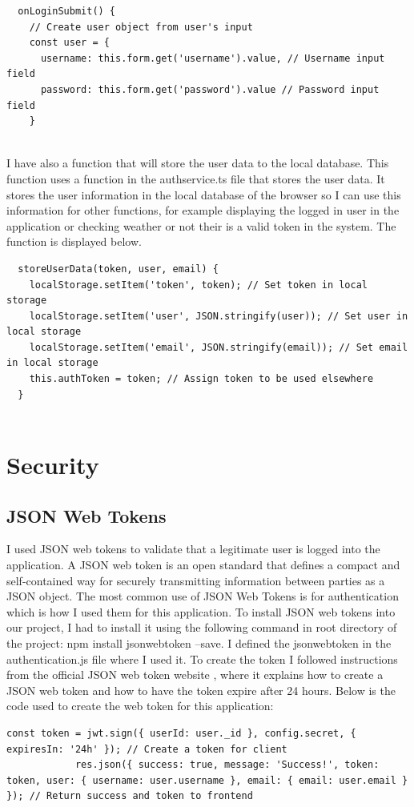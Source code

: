 \begin{lstlisting}
  onLoginSubmit() {
    // Create user object from user's input
    const user = {
      username: this.form.get('username').value, // Username input field
      password: this.form.get('password').value // Password input field
    }
  
\end{lstlisting}
I have also a function that will store the user data to the local database. This function uses a function in the authservice.ts file that stores the user data. It stores the user information in the local database of the browser so I can use this information for other functions, for example displaying the logged in user in the application or checking weather or not their is a valid token in the system. The function is displayed below.
\begin{lstlisting}
  storeUserData(token, user, email) {
    localStorage.setItem('token', token); // Set token in local storage
    localStorage.setItem('user', JSON.stringify(user)); // Set user in local storage
    localStorage.setItem('email', JSON.stringify(email)); // Set email in local storage
    this.authToken = token; // Assign token to be used elsewhere
  }
  
\end{lstlisting}

\section{Security}

\subsection{JSON Web Tokens}
I used JSON web tokens to validate that a legitimate user is logged into the application. A JSON web token is an open standard that defines a compact and self-contained way for securely transmitting information between parties as a JSON object. The most common use of JSON Web Tokens is for authentication which is how I used them for this application\cite{JSONWebT11}. To install JSON web tokens into our project, I had to install it using the following command in root directory of the project: npm install jsonwebtoken --save. I defined the jsonwebtoken in the authentication.js file where I used it. To create the token I followed instructions from the official JSON web token website \cite{jsonwebt54}, where it explains how to create a JSON web token and how to have the token expire after 24 hours. Below is the code used to create the web token for this application:
\begin{lstlisting}
const token = jwt.sign({ userId: user._id }, config.secret, { expiresIn: '24h' }); // Create a token for client
            res.json({ success: true, message: 'Success!', token: token, user: { username: user.username }, email: { email: user.email } }); // Return success and token to frontend
  
\end{lstlisting}

